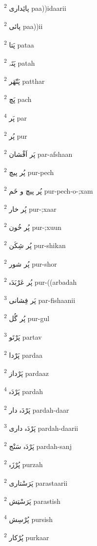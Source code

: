 \documentclass[12pt]{article}
\begin{document}
\begin{multicols}{5}
{\ur پائِداری}   \textsuperscript{2} paa))idaarii

{\ur پائی}   \textsuperscript{2} paa))ii

{\ur پَتا}   \textsuperscript{2} pataa

{\ur پَتَہ}   \textsuperscript{2} patah

{\ur پَتّھَر}   \textsuperscript{2} patthar

{\ur پَچ}   \textsuperscript{2} pach

{\ur پَر}   \textsuperscript{4} par

{\ur پُر}   \textsuperscript{2} pur

{\ur پَر اَفْشان}   \textsuperscript{2} par-afshaan

{\ur پُر پیچ}   \textsuperscript{2} pur-pech

{\ur پُر پیچ و خَم}   \textsuperscript{2} pur-pech-o-;xam

{\ur پُر خار}   \textsuperscript{2} pur-;xaar

{\ur پُر خُون}   \textsuperscript{2} pur-;xuun

{\ur پُر شِکَن}   \textsuperscript{2} pur-shikan

{\ur پُر شور}   \textsuperscript{2} pur-shor

{\ur پُر عَرْبَدَہ}   \textsuperscript{2} pur-((arbadah

{\ur پَر فِشانی}   \textsuperscript{3} par-fishaanii

{\ur پُر گُل}   \textsuperscript{2} pur-gul

{\ur پَرْتَو}   \textsuperscript{3} partav

{\ur پَرْدا}   \textsuperscript{2} pardaa

{\ur پَرْداز}   \textsuperscript{2} pardaaz

{\ur پَرْدَہ}   \textsuperscript{4} pardah

{\ur پَرْدَہ دار}   \textsuperscript{2} pardah-daar

{\ur پَرْدَہ داری}   \textsuperscript{3} pardah-daarii

{\ur پَرْدَہ سَنْج}   \textsuperscript{2} pardah-sanj

{\ur پُرْزَہ}   \textsuperscript{2} purzah

{\ur پَرَسْتاری}   \textsuperscript{2} parastaarii

{\ur پَرَسْتِش}   \textsuperscript{2} parastish

{\ur پُرْسِش}   \textsuperscript{4} pursish

{\ur پُرْکار}   \textsuperscript{2} purkaar


\end{multicols}
\end{document}
